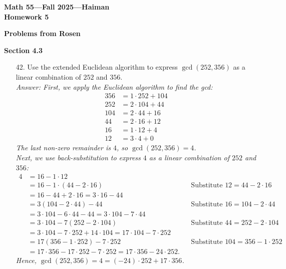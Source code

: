 \documentclass{article}
\begin{document}
\begin{center}
    \textbf{\LARGE Math 55—Fall 2025—Haiman} \\[6pt]
    \textbf{\Large Homework 5} \\[6pt]
\end{center}

\noindent \textbf{Problems from Rosen}

\medskip

\noindent \textbf{Section 4.3}
\begin{itemize}
    \item[42.] Use the extended Euclidean algorithm to express $\gcd(252,356)$ as a linear combination of $252$ and $356$.
    \medskip\\
    \textit{Answer: First, we apply the Euclidean algorithm to find the gcd:
    \[
    \begin{alignedat}{2}
        356&=1\cdot252+104\\
        252&=2\cdot104+44\\
        104&=2\cdot44+16\\
        44&=2\cdot16+12\\
        16&=1\cdot12+4\\
        12&=3\cdot4+0
    \end{alignedat}
    \]
    The last non-zero remainder is $4$, so $\gcd(252, 356) = 4$.
    \medskip\\
    Next, we use back-substitution to express $4$ as a linear combination of $252$ and $356$:
    \[
    \begin{aligned}
        4&=16-1\cdot12\\
         &=16-1\cdot(44-2\cdot16) &&\text{Substitute } 12 = 44 - 2 \cdot 16 \\
         &=16 - 44 + 2\cdot16 = 3\cdot16-44\\
         &=3(104-2\cdot44)-44 &&\text{Substitute } 16 = 104 - 2 \cdot 44 \\
         &=3\cdot104-6\cdot44-44 = 3\cdot104-7\cdot44\\
         &=3\cdot104-7(252-2\cdot104) &&\text{Substitute } 44 = 252 - 2 \cdot 104 \\
         &=3\cdot104-7\cdot252+14\cdot104 = 17\cdot104-7\cdot252\\
         &=17(356-1\cdot252)-7\cdot252 &&\text{Substitute } 104 = 356 - 1 \cdot 252 \\
         &=17\cdot356-17\cdot252-7\cdot252 = 17\cdot356-24\cdot252.
    \end{aligned}
    \]
    Hence, $\gcd(252,356)=4= (-24)\cdot 252 + 17\cdot 356$.}


\end{itemize}
\end{document}

